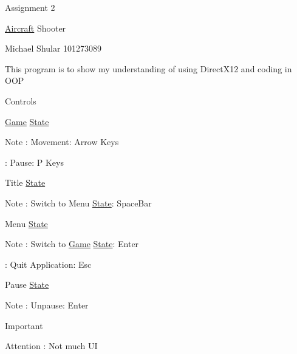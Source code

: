 Assignment 2

\mbox{\hyperlink{class_aircraft}{Aircraft}} Shooter

Michael Shular 101273089

This program is to show my understanding of using Direct\+X12 and coding in OOP

Controls

\mbox{\hyperlink{class_game}{Game}} \mbox{\hyperlink{class_state}{State}} \begin{DoxyNote}{Note}
\+: Movement\+: Arrow Keys 

\+: Pause\+: P Keys
\end{DoxyNote}
Title \mbox{\hyperlink{class_state}{State}} \begin{DoxyNote}{Note}
\+: Switch to Menu \mbox{\hyperlink{class_state}{State}}\+: Space\+Bar
\end{DoxyNote}
Menu \mbox{\hyperlink{class_state}{State}} \begin{DoxyNote}{Note}
\+: Switch to \mbox{\hyperlink{class_game}{Game}} \mbox{\hyperlink{class_state}{State}}\+: Enter 

\+: Quit Application\+: Esc ~\newline

\end{DoxyNote}
Pause \mbox{\hyperlink{class_state}{State}} \begin{DoxyNote}{Note}
\+: Unpause\+: Enter ~\newline

\end{DoxyNote}
Important \begin{DoxyAttention}{Attention}
\+: Not much UI 
\end{DoxyAttention}
